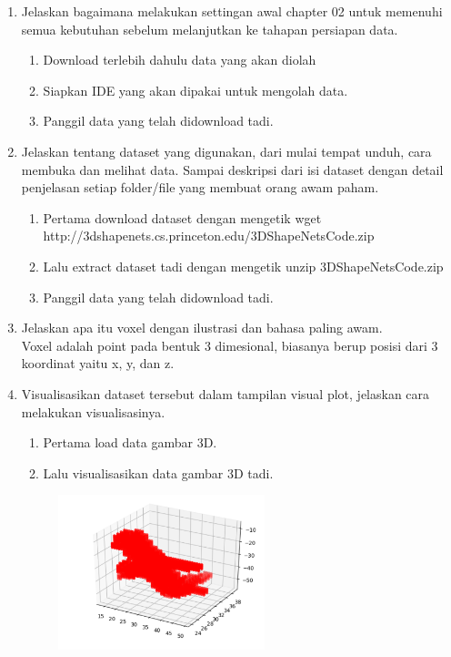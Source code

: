 \begin{enumerate}
\begin{enumerate}
	\end{enumerate}
	\item Jelaskan bagaimana melakukan settingan awal chapter 02 untuk memenuhi semua kebutuhan sebelum melanjutkan ke tahapan persiapan data.
	\begin{enumerate}
		\item Download terlebih dahulu data yang akan diolah
		\item Siapkan IDE yang akan dipakai untuk mengolah data.
		\item Panggil data yang telah didownload tadi.
	\end{enumerate}
	\item Jelaskan tentang dataset yang digunakan, dari mulai tempat unduh, cara membuka dan melihat data. Sampai deskripsi dari isi dataset dengan detail penjelasan setiap folder/file yang membuat orang awam paham.
	\begin{enumerate}
		\item Pertama download dataset dengan mengetik wget http://3dshapenets.cs.princeton.edu/3DShapeNetsCode.zip
		\item Lalu extract dataset tadi dengan mengetik unzip 3DShapeNetsCode.zip
		\item Panggil data yang telah didownload tadi.
	\end{enumerate}
	\item Jelaskan apa itu voxel dengan ilustrasi dan bahasa paling awam.\\
	Voxel adalah point pada bentuk 3 dimesional, biasanya berup posisi dari 3 koordinat yaitu x, y, dan z.
	
	\item Visualisasikan dataset tersebut dalam tampilan visual plot, jelaskan cara melakukan visualisasinya.
	\begin{enumerate}
		\item Pertama load data gambar 3D.
		\item Lalu visualisasikan data gambar 3D tadi.
	\end{enumerate}
	\begin{figure}[H]
		\includegraphics[width=6cm]{figures/1174006/chapter8/praktek/ex.png}
		\centering
	\end{figure}
	

\end{enumerate}
